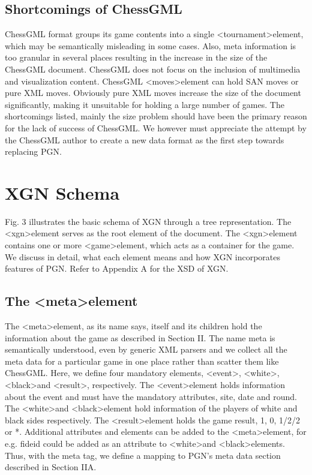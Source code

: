 \documentclass[conference]{IEEEtran}
\begin{document}
\subsection{Shortcomings of ChessGML}
ChessGML format groups its game contents into a single \textless tournament\textgreater  element, which may be semantically misleading in some cases. Also, meta information is too granular in several places resulting in the increase in the size of the ChessGML document. ChessGML does not focus on the inclusion of multimedia and visualization content. ChessGML \textless moves\textgreater  element can hold SAN moves or pure XML moves. Obviously pure XML moves increase the size of the document significantly, making it unsuitable for holding a large number of games. The shortcomings listed, mainly the size problem should have been the primary reason for the lack of success of ChessGML. We however must appreciate the attempt by the ChessGML author to create a new data format as the first step towards replacing PGN.


\section{XGN \textendash  Schema}
Fig. 3 illustrates the basic schema of XGN through a tree representation. The \textless xgn\textgreater  element serves as the root element of the document. The \textless xgn\textgreater  element contains one or more \textless game\textgreater  element, which acts as a container for the game. We discuss in detail, what each element means and how XGN incorporates features of PGN. Refer to Appendix A for the XSD of XGN.


\subsection{The \textless meta\textgreater  element}
The \textless meta\textgreater  element, as its name says, itself and its children hold the information about the game as described in Section II. The name meta is semantically understood, even by generic XML parsers and we collect all the meta data for a particular game in one place rather than scatter them like ChessGML. Here, we define four mandatory elements, \textless event\textgreater , \textless white\textgreater , \textless black\textgreater  and \textless result\textgreater , respectively. The \textless event\textgreater  element holds information about the event and must have the mandatory attributes, site, date and round. The \textless white\textgreater  and \textless black\textgreater  element hold information of the players of white and black sides respectively. The \textless result\textgreater  element holds the game result, 1, 0, 1/2/2 or *. Additional attributes and elements can be added to the \textless meta\textgreater  element, for e.g. fideid could be added as an attribute to \textless white\textgreater  and \textless black\textgreater  elements. Thus, with the meta tag, we define a mapping to PGN's meta data section described in Section II\textendash A.
\end{document}
